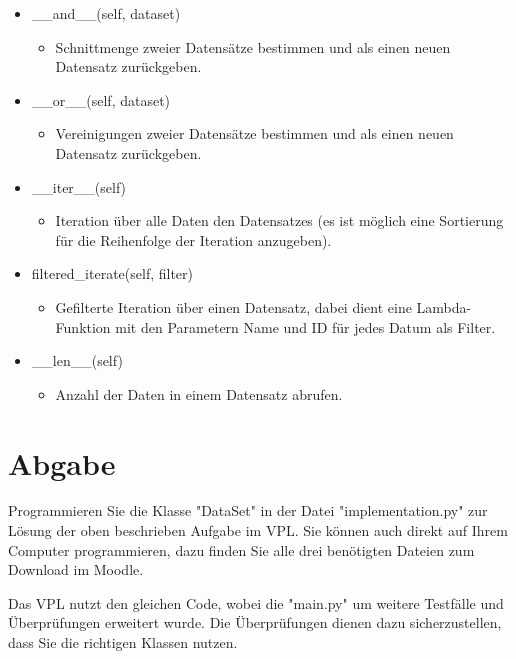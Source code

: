 \documentclass[
10pt,
a4paper
parskip=full
]{scrartcl}
\begin{document}
\begin{itemize}
            \item \_\_and\_\_(self, dataset)
                \begin{itemize}
                    \item [] Schnittmenge zweier Datensätze bestimmen und als einen neuen Datensatz zurückgeben.
                \end{itemize}
                
            \item \_\_or\_\_(self, dataset)
                \begin{itemize}
                    \item [] Vereinigungen zweier Datensätze bestimmen und als einen neuen Datensatz zurückgeben.
                \end{itemize}
                
            \item \_\_iter\_\_(self)
                \begin{itemize}
                    \item [] Iteration über alle Daten den Datensatzes (es ist möglich eine Sortierung für die Reihenfolge der Iteration anzugeben).
                \end{itemize}
                
            \item filtered\_iterate(self, filter)
                \begin{itemize}
                    \item [] Gefilterte Iteration über einen Datensatz, dabei dient eine Lambda-Funktion mit den Parametern Name und ID für jedes Datum als Filter.
                \end{itemize}
                
            \item \_\_len\_\_(self)
                \begin{itemize}
                    \item [] Anzahl der Daten in einem Datensatz abrufen.
                \end{itemize}
        \end{itemize}
    \section{Abgabe}
    Programmieren Sie die Klasse "DataSet" in der Datei "implementation.py" zur Lösung der oben beschrieben Aufgabe im VPL. Sie können auch direkt auf Ihrem Computer programmieren, dazu finden Sie alle drei benötigten Dateien zum Download im Moodle.

    Das VPL nutzt den gleichen Code, wobei die "main.py" um weitere Testfälle und Überprüfungen erweitert wurde. Die Überprüfungen dienen dazu sicherzustellen, dass Sie die richtigen Klassen nutzen.
\end{document}
